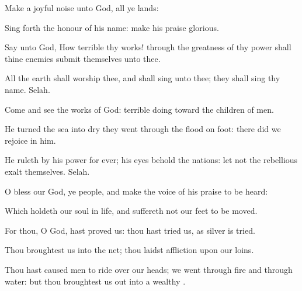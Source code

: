 {\Q {}Make a joyful
noise unto
God, all ye
lands:


\par }{\Q {}Sing
forth the
honour of his
name:
make his
praise
glorious.


\par }{\Q {}Say unto
God, How
terrible
{} thy
works! through the
greatness of thy
power shall thine
enemies
submit themselves unto thee.


\par }{\Q {}All the
earth shall
worship thee, and shall
sing unto thee; they shall
sing
{} thy
name.
Selah.


\par }{\Q {}Come and
see the
works of
God:
{}
terrible
{}
doing toward the
children of
men.


\par }{\Q {}He
turned the
sea into
dry
{} they
went through the
flood on
foot: there did we
rejoice in him.


\par }{\Q {}He
ruleth by his
power for
ever; his
eyes
behold the
nations: let not the
rebellious
exalt themselves.
Selah.


\par }{\BB \par }
{\Q {}O
bless our
God, ye
people, and make the
voice of his
praise to be
heard:


\par }{\Q {}Which
holdeth our
soul in
life, and
suffereth not our
feet to be
moved.


\par }{\Q {}For thou, O
God, hast
proved us: thou hast
tried us, as
silver is
tried.


\par }{\Q {}Thou
broughtest us into the
net; thou
laidst
affliction upon our
loins.


\par }{\Q {}Thou hast caused
men to
ride over our
heads; we
went through
fire and through
water: but thou broughtest us
out into a
wealthy
{}.


\par }{\BB \par }
